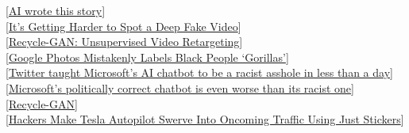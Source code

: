 \documentclass[10pt, compress]{beamer}
\begin{document}

\begin{frame}
  \vspace{1cm}

  [\href{https://www.youtube.com/watch?v=gLoI9hAX9dw}{AI wrote this story}] \\

  [\href{https://www.axios.com/ai-wrote-this-story-b71270f8-dffb-434d-a5a6-d7ef0d791b0a.html}{It’s Getting Harder to Spot a Deep Fake Video}] \\

  [\href{https://www.cs.cmu.edu/~aayushb/Recycle-GAN/}{Recycle-GAN: Unsupervised Video Retargeting}] \\

  [\href{https://bits.blogs.nytimes.com/2015/07/01/google-photos-mistakenly-labels-black-people-gorillas/}{Google Photos Mistakenly Labels Black People ‘Gorillas’}] \\

  [\href{https://www.theverge.com/2016/3/24/11297050/tay-microsoft-chatbot-racist}{Twitter taught Microsoft’s AI chatbot to be a racist asshole in less than a day}] \\

  [\href{https://qz.com/1340990/microsofts-politically-correct-chat-bot-is-even-worse-than-its-racist-one/}{Microsoft’s politically correct chatbot is even worse than its racist one}] \\

  [\href{https://github.com/aayushbansal/Recycle-GAN}{Recycle-GAN}] \\

  [\href{https://www.iflscience.com/technology/hackers-make-tesla-autopilot-swerve-into-oncoming-traffic-using-just-stickers/}{Hackers Make Tesla Autopilot Swerve Into Oncoming Traffic Using Just Stickers}] \\

\end{frame}
\end{document}
